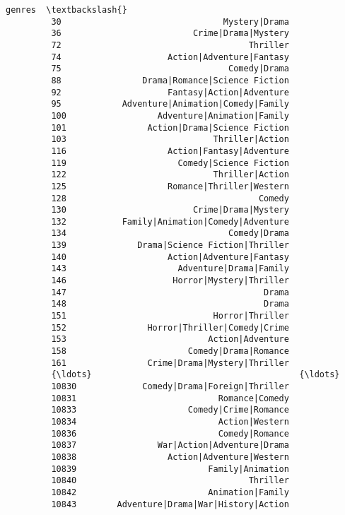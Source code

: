 \documentclass[11pt]{article}
\begin{document}
\begin{Verbatim}[commandchars=\\\{\}]
                                                  genres  \textbackslash{}
         30                                Mystery|Drama   
         36                          Crime|Drama|Mystery   
         72                                     Thriller   
         74                     Action|Adventure|Fantasy   
         75                                 Comedy|Drama   
         88                Drama|Romance|Science Fiction   
         92                     Fantasy|Action|Adventure   
         95            Adventure|Animation|Comedy|Family   
         100                  Adventure|Animation|Family   
         101                Action|Drama|Science Fiction   
         103                             Thriller|Action   
         116                    Action|Fantasy|Adventure   
         119                      Comedy|Science Fiction   
         122                             Thriller|Action   
         125                    Romance|Thriller|Western   
         128                                      Comedy   
         130                         Crime|Drama|Mystery   
         132           Family|Animation|Comedy|Adventure   
         134                                Comedy|Drama   
         139              Drama|Science Fiction|Thriller   
         140                    Action|Adventure|Fantasy   
         143                      Adventure|Drama|Family   
         146                     Horror|Mystery|Thriller   
         147                                       Drama   
         148                                       Drama   
         151                             Horror|Thriller   
         152                Horror|Thriller|Comedy|Crime   
         153                            Action|Adventure   
         158                        Comedy|Drama|Romance   
         161                Crime|Drama|Mystery|Thriller   
         {\ldots}                                         {\ldots}   
         10830             Comedy|Drama|Foreign|Thriller   
         10831                            Romance|Comedy   
         10833                      Comedy|Crime|Romance   
         10834                            Action|Western   
         10836                            Comedy|Romance   
         10837                War|Action|Adventure|Drama   
         10838                  Action|Adventure|Western   
         10839                          Family|Animation   
         10840                                  Thriller   
         10842                          Animation|Family   
         10843        Adventure|Drama|War|History|Action   

\end{Verbatim}
\end{document}
